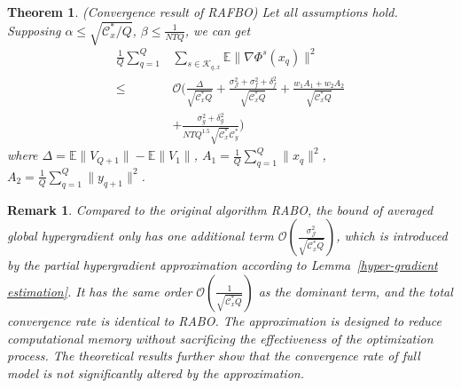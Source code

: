 \documentclass[lettersize,journal]{IEEEtran}
\newtheorem{remark}{Remark}
\newtheorem{theorem}{Theorem}
\begin{document}
\begin{theorem}\label{convergence2}
(Convergence result of RAFBO) Let all assumptions hold. Supposing $\alpha\leq \sqrt{\mathcal{C}_x^*/Q}$, $\beta \leq \frac{1}{NTQ}$, we can get
\begin{align}
     \frac{1}{Q}\sum_{q=1}^Q&\sum_{s\in \mathcal{K}_{q,x}}\mathbb{E}\|\nabla \Phi^s(x_{q})\|^2\\
     \leq& \mathcal{O}(\frac{\Delta}{\sqrt{\mathcal{C}_x^*Q}}+\frac{\sigma_{\mathcal{J}}^2+\sigma_f^2+\delta^2_f}{\sqrt{\mathcal{C}_x^*Q}}+\frac{w_1A_1+w_2A_2}{\sqrt{\mathcal{C}_x^*Q}}\nonumber\\
     &+\frac{\sigma_{g}^2+\delta_{g}^2}{NTQ^{1.5}\sqrt{\mathcal{C}_x^*}\mathcal{C}^{*}_{y}})\nonumber
\end{align}
where $\Delta=\mathbb{E}\|V_{Q+1}\|-\mathbb{E}\| V_{1}\|$, $A_1=\frac{1}{Q}\sum_{q=1}^Q\|x_q\|^2$, $A_2=\frac{1}{Q}\sum_{q=1}^Q\|y_{q+1}\|^2$.
\end{theorem}
\begin{remark}
Compared to the original algorithm \textit{RABO}, the bound of averaged global hypergradient only has one additional term $\mathcal{O}(\frac{\sigma_{\mathcal{J}}^2}{\sqrt{\mathcal{C}_x^*Q}})$, which is introduced by the partial hypergradient approximation according to Lemma~\ref{hyper-gradient estimation}. It has the same order $\mathcal{O}(\frac{1}{\sqrt{\mathcal{C}_x^*Q}})$ as the dominant term, and the total convergence rate is identical to \textit{RABO}. The approximation is designed to reduce computational memory without sacrificing the effectiveness of the optimization process. The theoretical results further show that the convergence rate of full model is not significantly altered by the approximation.
\end{remark}
\end{document}
